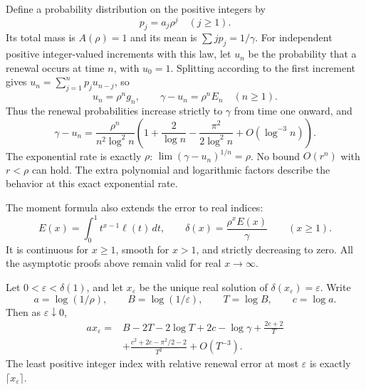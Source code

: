 Define a probability distribution on the positive integers by
\begin{equation}\label{eq:renewal-law}
 p_j=a_j\rho^j\quad(j\ge1).
\end{equation}
Its total mass is $A(\rho)=1$ and its mean is
$\sum jp_j=1/\gamma$. For independent positive integer-valued
increments with this law, let $u_n$ be the probability that a renewal
occurs at time $n$, with $u_0=1$. Splitting according to the first
increment gives
$u_n=\sum_{j=1}^n p_ju_{n-j}$, so
\begin{equation}\label{eq:renewal-u}
 u_n=\rho^n g_n,\qquad
 \gamma-u_n=\rho^n E_n\quad(n\ge1).
\end{equation}
Thus the renewal probabilities increase strictly to $\gamma$ from
time one onward, and
\begin{equation}\label{eq:renewal-sharp}
 \gamma-u_n=
 \frac{\rho^n}{n^2\log^2n}
 \left(1+\frac2{\log n}-\frac{\pi^2}{2\log^2n}
                         +O(\log^{-3}n)\right).
\end{equation}
The exponential rate is exactly $\rho$:
$\lim(\gamma-u_n)^{1/n}=\rho$. No bound $O(r^n)$ with $r<\rho$
can hold. The extra polynomial and logarithmic factors describe the
behavior at this exact exponential rate.

The moment formula also extends the error to real indices:
\begin{equation}\label{eq:continuous-error}
 E(x)=\int_0^1t^{x-1}\ell(t)\,dt,
 \qquad \delta(x)=\frac{\rho^xE(x)}\gamma\qquad(x\ge1).
\end{equation}
It is continuous for $x\ge1$, smooth for $x>1$, and strictly decreasing
to zero. All the asymptotic proofs above remain valid for real
$x\to\infty$.

\begin{theorem}
\label{thm:inverse}
Let $0<\varepsilon<\delta(1)$, and let $x_\varepsilon$ be the
unique real solution of $\delta(x_\varepsilon)=\varepsilon$.
Write
\[
 a=\log(1/\rho),\qquad
 B=\log(1/\varepsilon),\qquad T=\log B,\qquad c=\log a.
\]
Then as $\varepsilon\downarrow0$,
\begin{align}\label{eq:inverse-expansion}
 ax_\varepsilon={}&B-2T-2\log T+2c-\log\gamma
             +\frac{2c+2}{T}\nonumber\\
 &+\frac{c^2+2c-\pi^2/2-2}{T^2}+O(T^{-3}).
\end{align}
The least positive integer index with relative renewal error at most
$\varepsilon$ is exactly $\lceil x_\varepsilon\rceil$.
\end{theorem}

